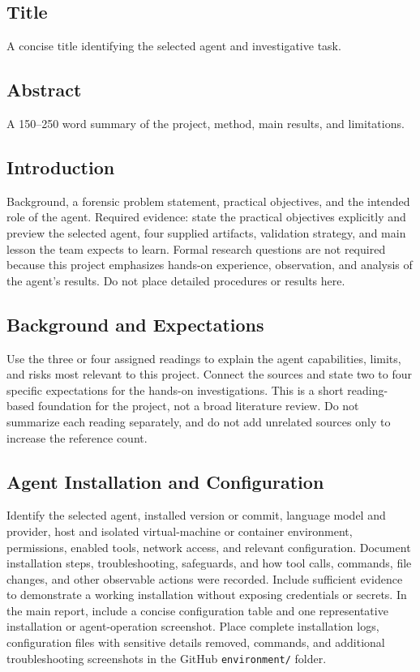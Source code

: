 \documentclass[12pt,letterpaper]{article}
\begin{document}
\subsection{Title}
A concise title identifying the selected agent and investigative task.

\subsection{Abstract}
A 150--250 word summary of the project, method, main results, and limitations.

\subsection{Introduction}
Background, a forensic problem statement, practical objectives, and the intended role of the agent.
Required evidence: state the practical objectives explicitly and preview the selected agent, four supplied artifacts, validation strategy, and main lesson the team expects to learn. Formal research questions are not required because this project emphasizes hands-on experience, observation, and analysis of the agent's results. Do not place detailed procedures or results here.

\subsection{Background and Expectations}
Use the three or four assigned readings to explain the agent capabilities, limits, and risks most relevant to this project. Connect the sources and state two to four specific expectations for the hands-on investigations. This is a short reading-based foundation for the project, not a broad literature review. Do not summarize each reading separately, and do not add unrelated sources only to increase the reference count.

\subsection{Agent Installation and Configuration}
Identify the selected agent, installed version or commit, language model and provider, host and isolated virtual-machine or container environment, permissions, enabled tools, network access, and relevant configuration. Document installation steps, troubleshooting, safeguards, and how tool calls, commands, file changes, and other observable actions were recorded. Include sufficient evidence to demonstrate a working installation without exposing credentials or secrets.
In the main report, include a concise configuration table and one representative installation or agent-operation screenshot. Place complete installation logs, configuration files with sensitive details removed, commands, and additional troubleshooting screenshots in the GitHub \texttt{environment/} folder.
\end{document}
